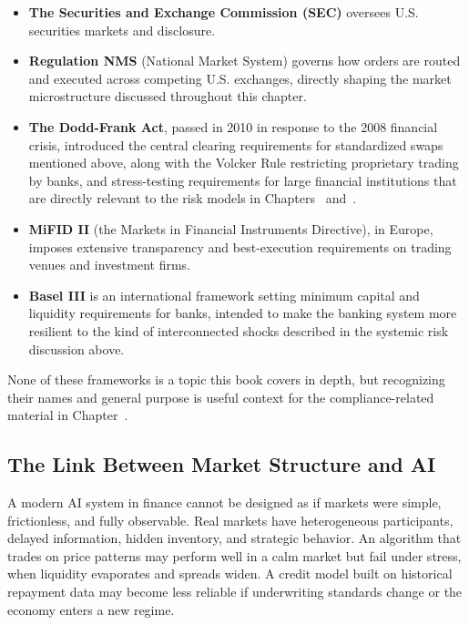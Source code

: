 \documentclass[../ai_in_finance]{subfiles}
\begin{document}
\begin{itemize}
    \item \textbf{The Securities and Exchange Commission (SEC)} oversees U.S. securities markets and disclosure.
    \item \textbf{Regulation NMS} (National Market System) governs how orders are routed and executed across competing U.S. exchanges, directly shaping the market microstructure discussed throughout this chapter.
    \item \textbf{The Dodd-Frank Act}, passed in 2010 in response to the 2008 financial crisis, introduced the central clearing requirements for standardized swaps mentioned above, along with the Volcker Rule restricting proprietary trading by banks, and stress-testing requirements for large financial institutions that are directly relevant to the risk models in Chapters~ and~.
    \item \textbf{MiFID II} (the Markets in Financial Instruments Directive), in Europe, imposes extensive transparency and best-execution requirements on trading venues and investment firms.
    \item \textbf{Basel III} is an international framework setting minimum capital and liquidity requirements for banks, intended to make the banking system more resilient to the kind of interconnected shocks described in the systemic risk discussion above.
\end{itemize}

None of these frameworks is a topic this book covers in depth, but recognizing their names and general purpose is useful context for the compliance-related material in Chapter~.

\subsection{The Link Between Market Structure and AI}

A modern AI system in finance cannot be designed as if markets were simple, frictionless, and fully observable. Real markets have heterogeneous participants, delayed information, hidden inventory, and strategic behavior. An algorithm that trades on price patterns may perform well in a calm market but fail under stress, when liquidity evaporates and spreads widen. A credit model built on historical repayment data may become less reliable if underwriting standards change or the economy enters a new regime.
\end{document}
